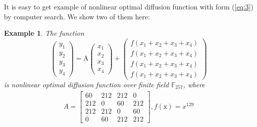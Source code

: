 \documentclass[12pt,a4paper]{article}
\newcommand{\0}{\textbf{0}}
\newcommand{\1}{\textbf{1}}
\newtheorem{example}{Example}
\begin{document}
    It is easy to get example of nonlinear optimal diffusion function with form (\ref{eq:3}) by computer search. 
    We show two of them here:
    \begin{example}
        The function 
        $$
        \left(\begin{array}{l}
        y_{1} \\ y_{2} \\ y_{3} \\y_{4}
        \end{array}\right)=\mathrm{A}\left(\begin{array}{l}
        x_{1} \\x_{2} \\x_{3} \\x_{4}
        \end{array}\right)+\left(\begin{array}{l}
        f\left(x_{1}+x_{2}+x_{3}+x_{4}\right) \\
        f\left(x_{1}+x_{2}+x_{3}+x_{4}\right) \\
        f\left(x_{1}+x_{2}+x_{3}+x_{4}\right) \\
        f\left(x_{1}+x_{2}+x_{3}+x_{4}\right)
        \end{array}\right)
        $$
        is nonlinear optimal diffusion function over finite field $\mathbb{F}_{257}$, where
        $$
        \begin{gathered}
        A=\left[\begin{array}{cccc}
        60 & 212 & 212 & 0 \\
        212 & 0 & 60 & 212 \\
        212 & 212 & 0 & 60 \\
        0 & 60 & 212 & 212
        \end{array}\right], 
        f(\mathrm{x})=x^{129}
        \end{gathered}
        $$
    \end{example}
\end{document}
